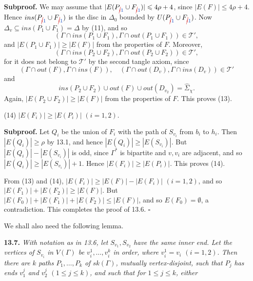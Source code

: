 \textbf{Subproof.} We may assume that $|E(P_{\delm{i}\fix{1}} \cup F_{\delm{i}\fix{1}})| \le 4\rho + 4$, since $|E(F)| \le 4\rho + 4$. Hence $ins(P_{\delm{i}\fix{1}} \cup F_{\delm{i}\fix{1}})$ is the disc in $\Delta_0$ bounded by $U(P_{\delm{i}\fix{1}} \cup F_{\delm{i}\fix{1}})$. Now $\Delta_v \subseteq ins(P_1 \cup F_1) = \Delta$ by (11), and so
\begin{equation*}
(\Gamma \cap ins(P_1 \cup F_1), \Gamma \cap out(P_1 \cup F_1)) \in \mathscr{T}',
\end{equation*}
and $|E(P_1 \cup F_1)| \ge |E(F)|$ from the properties of $F$. Moreover,
\begin{equation*}
(\Gamma \cap ins(P_2 \cup F_2), \Gamma \cap out(P_2 \cup F_2)) \in \mathscr{T}',
\end{equation*}
for it does not belong to $\mathscr{T}'$ by the second tangle axiom, since
\begin{equation*}
(\Gamma \cap out(F), \Gamma \cap ins(F)), \quad (\Gamma \cap out(D_v), \Gamma \cap ins(D_v)) \in \mathscr{T}'
\end{equation*}
and
\begin{equation*}
ins(P_2 \cup F_2) \cup out(F) \cup out(D_{v_2}) = \hat{\Sigma}_\chi.
\end{equation*}
Again, $|E(P_2 \cup F_2)| \ge |E(F)|$ from the properties of $F$. This proves (13).

\hspace*{12pt}(14) $|E(F_i)| \ge |E(P_i)|$ $(i = 1, 2)$.

\textbf{Subproof.} Let $Q_i$ be the union of $F_i$ with the path of $S_{v_i}$ from $b_i$ to $h_i$. Then $|E(Q_i)| \ge \rho$ by 13.1, and hence $|E(Q_i)| \ge |E(S_{v_i})|$. But $|E(Q_i)| - |E(S_{v_i})|$ is odd, since $\Gamma^*$ is bipartite and $v, v_i$ are adjacent, and so $|E(Q_i)| \ge |E(S_{v_i})| + 1$. Hence $|E(F_i)| \ge |E(P_i)|$. This proves (14).

From (13) and (14), $|E(F_i)| \ge |E(F)| - |E(F_i)|$ $(i = 1, 2)$, and so $|E(F_1)| + |E(F_2)| \ge |E(F)|$. But $|E(F_0)| + |E(F_1)| + |E(F_2)| \le |E(F)|$, and so $E(F_0) = \emptyset$, a contradiction. This completes the proof of 13.6. $\square$

We shall also need the following lemma.

\textbf{13.7.} \textit{With notation as in 13.6, let $S_{v_1}, S_{v_2}$ have the same inner end. Let the vertices of $S_{v_i}$ in $V(\Gamma)$ be $v_i^1, \dots, v_i^k$ in order, where $v_i^1 = v_i$ $(i = 1, 2)$. Then there are $k$ paths $P_1, \dots, P_k$ of $sk(\Gamma)$, mutually vertex-disjoint, such that $P_j$ has ends $v_1^j$ and $v_2^j$ $(1 \le j \le k)$, and such that for $1 \le j \le k$, either}


